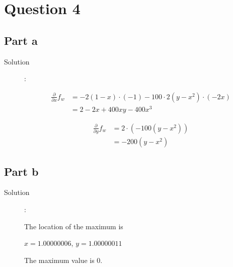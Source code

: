 \documentclass[a4paper,11pt]{article}
\begin{document}
\section{Question 4}
\subsection{Part a}
\begin{description}
  \item [Solution]: 

\begin{align*}
\frac{\partial}{\partial x}f_w &= -2(1-x)\cdot(-1)-100\cdot2(y-x^2)\cdot(-2x) \\
					&= 2-2x+400xy-400x^3
\end{align*}

\begin{align*}
\frac{\partial}{\partial y}f_w &= 2\cdot (-100(y-x^2)) \\
					&= -200(y-x^2)
\end{align*}
\end{description}
\subsection{Part b}
\begin{description}
  \item [Solution]: 

The location of the maximum is 
\begin{center}
$x=1.00000006$, $y=1.00000011$
\end{center}
The maximum value is  0.
\end{description}
\end{document}
